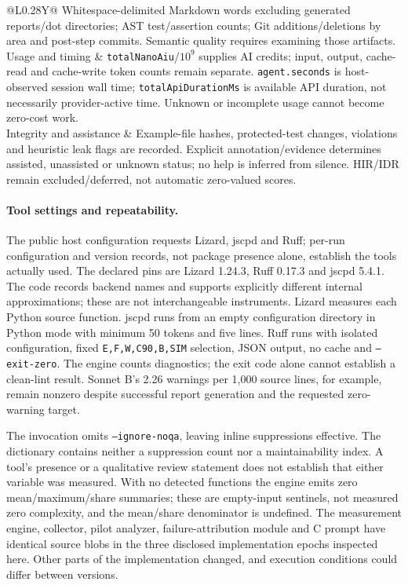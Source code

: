 \begin{table}[!htbp]
\begin{tabularx}{\linewidth}{@{}L{0.28\linewidth}Y@{}}
Whitespace-delimited Markdown words excluding generated reports/dot
directories; AST test/assertion counts; Git additions/deletions by area
and post-step commits. Semantic quality requires examining those artifacts. \\
Usage and timing &
\texttt{totalNanoAiu}/$10^9$ supplies AI credits; input, output, cache-read
and cache-write token counts remain separate. \texttt{agent.seconds} is
host-observed session wall time; \texttt{totalApiDurationMs} is available
API duration, not necessarily provider-active time. Unknown or incomplete
usage cannot become zero-cost work. \\
Integrity and assistance &
Example-file hashes, protected-test changes, violations and heuristic leak
flags are recorded. Explicit annotation/evidence determines assisted,
unassisted or unknown status; no help is inferred from silence. HIR/IDR
remain excluded/deferred, not automatic zero-valued scores. \\
\bottomrule
\end{tabularx}
\end{table}

\paragraph{Tool settings and repeatability.}
The public host configuration requests Lizard, jscpd and Ruff; per-run
configuration and version records, not package presence alone, establish
the tools actually used. The declared pins are Lizard 1.24.3, Ruff 0.17.3
and jscpd 5.4.1. The code records backend names and supports explicitly
different internal approximations; these are not interchangeable instruments.
Lizard measures each Python source function\@. jscpd runs from an empty
configuration directory in Python mode with minimum 50 tokens and five
lines. Ruff runs with isolated configuration, fixed
\texttt{E,F,W,C90,B,SIM} selection, JSON output, no cache and
\texttt{--exit-zero}. The engine counts diagnostics; the exit code alone
cannot establish a clean-lint result. Sonnet B's 2.26 warnings per 1,000
source lines, for example, remain nonzero despite successful report
generation and the requested zero-warning target.

The invocation omits \texttt{--ignore-noqa}, leaving inline suppressions
effective. The dictionary contains neither a suppression count nor a
maintainability index. A tool's presence or a qualitative review statement
does not establish that either variable was measured.
With no detected functions the engine emits zero mean/maximum/share
summaries; these are empty-input sentinels, not measured zero complexity,
and the mean/share denominator is undefined.
The measurement engine, collector, pilot analyzer, failure-attribution
module and C prompt have identical source blobs in the three disclosed
implementation epochs inspected here. Other parts of the implementation
changed, and execution conditions could differ between versions.

